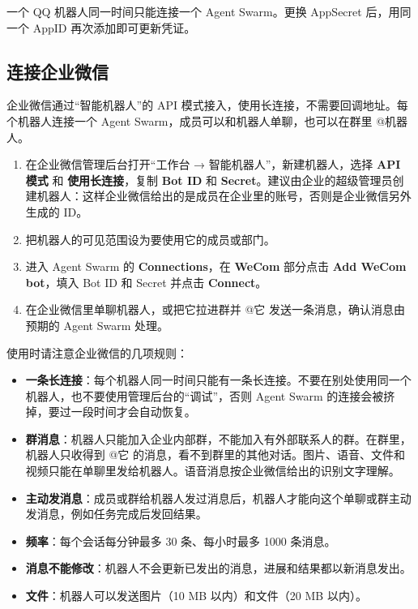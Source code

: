 \documentclass[UTF8,a4paper,11pt]{ctexart}
\begin{document}
一个 QQ 机器人同一时间只能连接一个 Agent Swarm。更换 AppSecret 后，用同一个 AppID 再次添加即可更新凭证。

\subsection{连接企业微信}

企业微信通过“智能机器人”的 API 模式接入，使用长连接，不需要回调地址。每个机器人连接一个 Agent Swarm，成员可以和机器人单聊，也可以在群里 @机器人。

\begin{enumerate}
  \item 在企业微信管理后台打开“工作台 → 智能机器人”，新建机器人，选择 \textbf{API 模式} 和 \textbf{使用长连接}，复制 \textbf{Bot ID} 和 \textbf{Secret}。建议由企业的超级管理员创建机器人：这样企业微信给出的是成员在企业里的账号，否则是企业微信另外生成的 ID。
  \item 把机器人的可见范围设为要使用它的成员或部门。
  \item 进入 Agent Swarm 的 \textbf{Connections}，在 \textbf{WeCom} 部分点击 \textbf{Add WeCom bot}，填入 Bot ID 和 Secret 并点击 \textbf{Connect}。
  \item 在企业微信里单聊机器人，或把它拉进群并 @它 发送一条消息，确认消息由预期的 Agent Swarm 处理。
\end{enumerate}

使用时请注意企业微信的几项规则：

\begin{itemize}
  \item \textbf{一条长连接}：每个机器人同一时间只能有一条长连接。不要在别处使用同一个机器人，也不要使用管理后台的“调试”，否则 Agent Swarm 的连接会被挤掉，要过一段时间才会自动恢复。
  \item \textbf{群消息}：机器人只能加入企业内部群，不能加入有外部联系人的群。在群里，机器人只收得到 @它 的消息，看不到群里的其他对话。图片、语音、文件和视频只能在单聊里发给机器人。语音消息按企业微信给出的识别文字理解。
  \item \textbf{主动发消息}：成员或群给机器人发过消息后，机器人才能向这个单聊或群主动发消息，例如任务完成后发回结果。
  \item \textbf{频率}：每个会话每分钟最多 30 条、每小时最多 1000 条消息。
  \item \textbf{消息不能修改}：机器人不会更新已发出的消息，进展和结果都以新消息发出。
  \item \textbf{文件}：机器人可以发送图片（10 MB 以内）和文件（20 MB 以内）。
\end{itemize}
\end{document}
